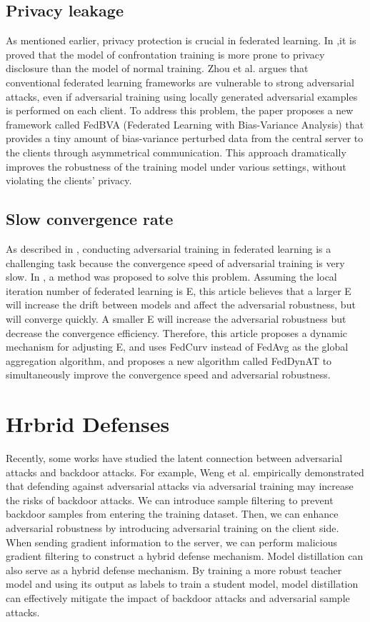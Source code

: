 \documentclass[conference]{IEEEtran}
\begin{document}
\subsection{Privacy leakage} 
As mentioned earlier, privacy protection is crucial in federated learning.
In \cite{b106},it is proved that the model of confrontation training is more prone to
privacy disclosure than the model of normal training.
Zhou et al.\cite{103} argues that conventional federated learning frameworks are vulnerable
to strong adversarial attacks, even if adversarial training using locally
generated adversarial examples is performed on each client. To address this
problem, the paper proposes a new framework called FedBVA (Federated Learning
with Bias-Variance Analysis) that provides a tiny amount of bias-variance
perturbed data from the central server to the clients through asymmetrical
communication. This approach dramatically improves the robustness of the
training model under various settings, without violating the clients' privacy.

\subsection{Slow convergence rate}
As described in \cite{b34}, conducting adversarial training in federated learning is a challenging task because the convergence speed of adversarial training is very slow.
In \cite{b107}, a method was proposed to solve this problem.
Assuming the local iteration number of federated learning is E, this article believes that a larger E will
increase the drift between models and affect the adversarial robustness, but will converge quickly. A smaller
E will increase the adversarial robustness but decrease the convergence efficiency. Therefore, this article
proposes a dynamic mechanism for adjusting E, and uses FedCurv instead of FedAvg as the global aggregation
algorithm, and proposes a new algorithm called FedDynAT to simultaneously improve the convergence
speed and adversarial robustness.


\section{Hrbrid Defenses}
Recently, some works have studied the latent connection between adversarial attacks and backdoor attacks.
For example, Weng et al. \cite{b66}empirically demonstrated that defending
against adversarial attacks via adversarial training may increase the risks of backdoor attacks.
We can introduce sample filtering to prevent backdoor samples from entering the training dataset. 
Then, we can enhance adversarial robustness by introducing adversarial training on the client side. 
When sending gradient information to the server, we can perform malicious gradient filtering to construct a hybrid defense mechanism.
Model distillation can also serve as a hybrid defense mechanism. 
By training a more robust teacher model and using its output as labels to train a student model, 
model distillation can effectively mitigate the impact of backdoor attacks and adversarial sample attacks.
\end{document}
